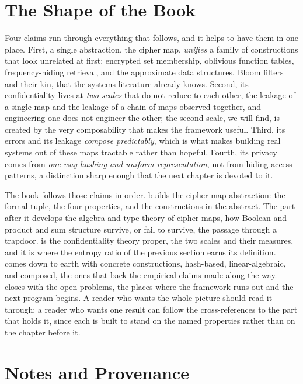 \section{The Shape of the Book}
\label{sec:book-shape}

Four claims run through everything that follows, and it helps to have them
in one place. First, a single abstraction, the cipher map, \emph{unifies} a
family of constructions that look unrelated at first: encrypted set
membership, oblivious function tables, frequency-hiding retrieval, and the
approximate data structures, Bloom filters and their kin, that the systems
literature already knows. Second, its confidentiality lives at \emph{two
scales} that do not reduce to each other, the leakage of a single map and
the leakage of a chain of maps observed together, and engineering one does
not engineer the other; the second scale, we will find, is created by the
very composability that makes the framework useful. Third, its errors and
its leakage \emph{compose predictably}, which is what makes building real
systems out of these maps tractable rather than hopeful. Fourth, its
privacy comes from \emph{one-way hashing and uniform representation}, not
from hiding access patterns, a distinction sharp enough that the next
chapter is devoted to it.

The book follows those claims in order.  builds the
cipher map abstraction: the formal tuple, the four properties, and the
constructions in the abstract. The part after it develops the algebra and
type theory of cipher maps, how Boolean and product and sum structure
survive, or fail to survive, the passage through a trapdoor.
 is the confidentiality theory proper, the two
scales and their measures, and it is where the entropy ratio of the
previous section earns its definition.  comes down
to earth with concrete constructions, hash-based, linear-algebraic, and
composed, the ones that back the empirical claims made along the way.
 closes with the open problems, the places where the
framework runs out and the next program begins. A reader who wants the
whole picture should read it through; a reader who wants one result can
follow the cross-references to the part that holds it, since each is built
to stand on the named properties rather than on the chapter before it.

\section{Notes and Provenance}
\label{sec:ch1-notes}

